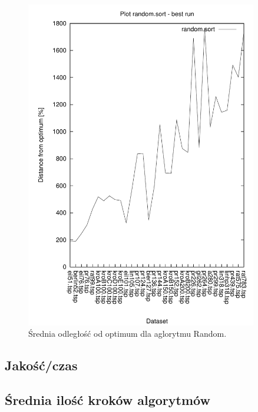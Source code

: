\begin{figure}
\begin{center}
\includegraphics[width=0.9\textwidth]{wykresy/random_sort_best}
\end{center}
\caption{Średnia odległość od optimum dla aglorytmu Random.}
\label{fig-3d}
\end{figure}

\subsection{Jakość/czas}

\subsection{Średnia ilość kroków algorytmów}